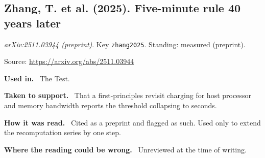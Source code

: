 \documentclass[11pt,oneside]{article}
\newcommand{\field}[1]{\par\noindent\textbf{\color{accent}#1.}\ }
\begin{document}
\hypertarget{src:zhang2025}{}
\subsection*{Zhang, T. et al. (2025). Five-minute rule 40 years later}
\noindent\small\emph{arXiv:2511.03944 (preprint)}. Key \texttt{zhang2025}. Standing: measured (preprint).
\par\noindent\small Source: \url{https://arxiv.org/abs/2511.03944}
\normalsize
\field{Used in} The Test.
\field{Taken to support} That a first-principles revisit charging for host processor and memory bandwidth reports the threshold collapsing to seconds.
\field{How it was read} Cited as a preprint and flagged as such. Used only to extend the recomputation series by one step.
\field{Where the reading could be wrong} Unreviewed at the time of writing.
\end{document}
